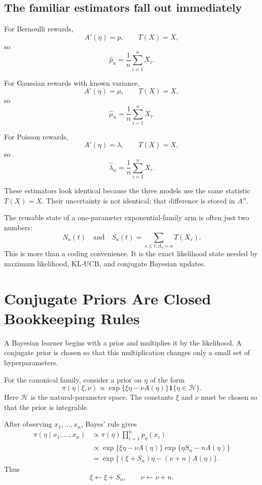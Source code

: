 \documentclass[en,nofont,11pt]{elegantbook}
\newcommand{\ind}{\mathbf{1}}
\begin{document}
\section{The familiar estimators fall out immediately}

For Bernoulli rewards,
\[
A'(\eta)=p,
\qquad
T(X)=X,
\]
so
\[
\widehat p_n=\frac{1}{n}\sum_{i=1}^{n}X_i.
\]

For Gaussian rewards with known variance,
\[
A'(\eta)=\mu,
\qquad
T(X)=X,
\]
so
\[
\widehat\mu_n=\frac{1}{n}\sum_{i=1}^{n}X_i.
\]

For Poisson rewards,
\[
A'(\eta)=\lambda,
\qquad
T(X)=X,
\]
so
\[
\widehat\lambda_n=\frac{1}{n}\sum_{i=1}^{n}X_i.
\]

These estimators look identical because the three models use the same statistic $T(X)=X$. Their uncertainty is not identical; that difference is stored in $A''$.

\begin{researchbox}
The reusable state of a one-parameter exponential-family arm is often just two numbers:
\[
N_a(t)
\quad\text{and}\quad
S_a(t)=\sum_{s\le t:A_s=a}T(X_s).
\]
This is more than a coding convenience. It is the exact likelihood state needed by maximum likelihood, KL-UCB, and conjugate Bayesian updates.
\end{researchbox}

\chapter{Conjugate Priors Are Closed Bookkeeping Rules}

A Bayesian learner begins with a prior and multiplies it by the likelihood. A conjugate prior is chosen so that this multiplication changes only a small set of hyperparameters.

For the canonical family, consider a prior on $\eta$ of the form
\begin{equation}
\pi(\eta\mid\xi,\nu)
\propto
\exp\{\xi\eta-\nu A(\eta)\}\ind\{\eta\in\mathcal H\}.
\label{eq:generic-conjugate}
\end{equation}
Here $\mathcal H$ is the natural-parameter space. The constants $\xi$ and $\nu$ must be chosen so that the prior is integrable.

After observing $x_1,\ldots,x_n$, Bayes' rule gives
\begin{align*}
\pi(\eta\mid x_1,\ldots,x_n)
&\propto
\pi(\eta)\prod_{i=1}^{n}p_\eta(x_i)\\
&\propto
\exp\{\xi\eta-\nu A(\eta)\}
\exp\{\eta S_n-nA(\eta)\}\\
&=\exp\{(\xi+S_n)\eta-(\nu+n)A(\eta)\}.
\end{align*}
Thus
\begin{equation}
\boxed{
\xi\leftarrow\xi+S_n,
\qquad
\nu\leftarrow\nu+n.
}
\label{eq:generic-update}
\end{equation}
\end{document}
